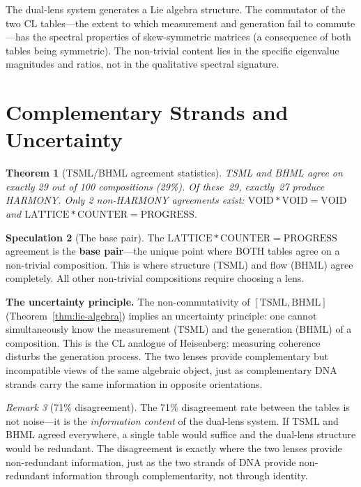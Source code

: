 \documentclass[11pt]{article}
\newtheorem{theorem}{Theorem}[section]
\theoremstyle{definition}
\newtheorem{speculation}[theorem]{Speculation}
\theoremstyle{remark}
\newtheorem{remark}[theorem]{Remark}
\begin{document}
The dual-lens system generates a Lie algebra structure.  The commutator of the
two CL tables---the extent to which measurement and generation fail to
commute---has the spectral properties of skew-symmetric matrices (a consequence
of both tables being symmetric).  The non-trivial content lies in the specific
eigenvalue magnitudes and ratios, not in the qualitative spectral signature.

\section{Complementary Strands and Uncertainty}
\label{sec:complementary-strands}

\begin{theorem}[TSML/BHML agreement statistics]
\label{thm:agreement}
TSML and BHML agree on exactly 29 out of 100 compositions (29\%).  Of these~29,
exactly~27 produce HARMONY.  Only 2 non-HARMONY agreements exist:
$\text{VOID} \ast \text{VOID} = \text{VOID}$ and
$\text{LATTICE} \ast \text{COUNTER} = \text{PROGRESS}$.
\end{theorem}

\begin{speculation}[The base pair]
\label{spec:base-pair}
The $\text{LATTICE} \ast \text{COUNTER} = \text{PROGRESS}$ agreement is the
\textbf{base pair}---the unique point where BOTH tables agree on a non-trivial
composition.  This is where structure (TSML) and flow (BHML) agree completely.
All other non-trivial compositions require choosing a lens.
\end{speculation}

\textbf{The uncertainty principle.}
The non-commutativity of $[\text{TSML}, \text{BHML}]$
(Theorem~\ref{thm:lie-algebra}) implies an uncertainty principle: one cannot
simultaneously know the measurement (TSML) and the generation (BHML) of a
composition.  This is the CL analogue of Heisenberg: measuring coherence
disturbs the generation process.  The two lenses provide complementary but
incompatible views of the same algebraic object, just as complementary DNA
strands carry the same information in opposite orientations.

\begin{remark}[71\% disagreement]
The 71\% disagreement rate between the tables is not noise---it is the
\emph{information content} of the dual-lens system.  If TSML and BHML agreed
everywhere, a single table would suffice and the dual-lens structure would be
redundant.  The disagreement is exactly where the two lenses provide
non-redundant information, just as the two strands of DNA provide
non-redundant information through complementarity, not through identity.
\end{remark}
\end{document}
